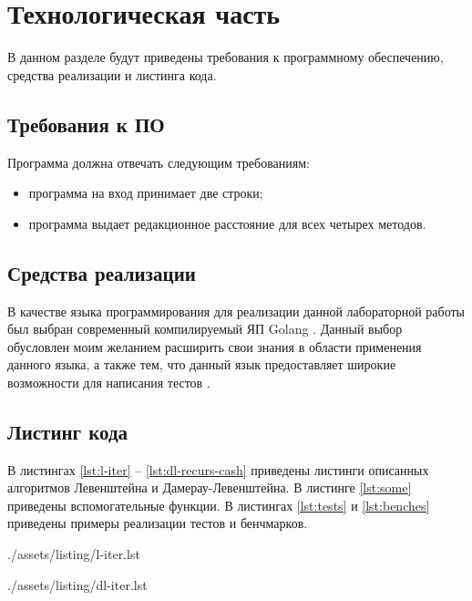 \chapter{Технологическая часть}

В данном разделе будут приведены требования к программному обеспечению, средства реализации и листинга кода.

\section{Требования к ПО}

Программа должна отвечать следующим требованиям:
\begin{itemize}
	\item программа на вход принимает две строки;
	\item программа выдает редакционное расстояние для всех четырех методов. 
\end{itemize}

\section{Средства реализации}

В качестве языка программирования для реализации данной лабораторной работы был выбран современный компилируемый ЯП Golang \cite{golang}.
Данный выбор обусловлен моим желанием расширить свои знания в области применения данного языка, а также тем, что данный язык предоставляет широкие возможности для написания тестов \cite{gotest}.

\section{Листинг кода}

В листингах \ref{lst:l-iter} -- \ref{lst:dl-recurs-cash} приведены листинги описанных алгоритмов Левенштейна и Дамерау-Левенштейна.
В листинге \ref{lst:some} приведены вспомогательные функции.
В листингах \ref{lst:tests} и \ref{lst:benches} приведены примеры реализации тестов и бенчмарков.

\clearpage
\begin{lstinputlisting}[
	caption={Итеративный алгоритм Левенштейна},
	label={lst:l-iter},
	style={golang}
]{./assets/listing/l-iter.lst}
\end{lstinputlisting}

\clearpage
\begin{lstinputlisting}[
	caption={Итеративный алгоритм Дамерау-Левенштейна},
	label={lst:dl-iter},
	style={golang}
]{./assets/listing/dl-iter.lst}
\end{lstinputlisting}

